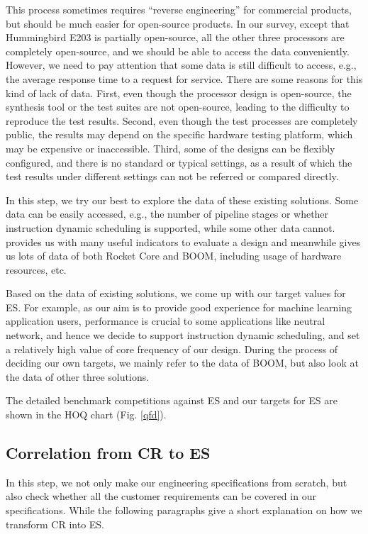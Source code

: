 This process sometimes requires ``reverse engineering'' for commercial products, but should be much easier for open-source products. In our survey, except that Hummingbird E203 is partially open-source, all the other three processors are completely open-source, and we should be able to access the data conveniently. However, we need to pay attention that some data is still difficult to access, e.g., the average response time to a request for service. There are some reasons for this kind of lack of data. First, even though the processor design is open-source, the synthesis tool or the test suites are not open-source, leading to the difficulty to reproduce the test results. Second, even though the test processes are completely public, the results may depend on the specific hardware testing platform, which may be expensive or inaccessible. Third, some of the designs can be flexibly configured, and there is no standard or typical settings, as a result of which the test results under different settings can not be referred or compared directly.

In this step, we try our best to explore the data of these existing solutions. Some data can be easily accessed, e.g., the number of pipeline stages or whether instruction dynamic scheduling is supported, while some other data cannot. \cite{processor_benchmark} provides us with many useful indicators to evaluate a design and meanwhile gives us lots of data of both Rocket Core and BOOM, including usage of hardware resources, etc.

Based on the data of existing solutions, we come up with our target values for ES. For example, as our aim is to provide good experience for machine learning application users, performance is crucial to some applications like neutral network, and hence we decide to support instruction dynamic scheduling, and set a relatively high value of core frequency of our design. During the process of deciding our own targets, we mainly refer to the data of BOOM, but also look at the data of other three solutions.

The detailed benchmark competitions against ES and our targets for ES are shown in the HOQ chart (Fig. \ref{qfd}).

\subsection{Correlation from CR to ES}
In this step, we not only make our engineering specifications from scratch, but also check whether all the customer requirements can be covered in our specifications. While the following paragraphs give a short explanation on how we transform CR into ES.

